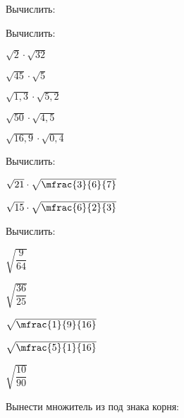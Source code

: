 \begin{class}[number=3]
\begin{listofex}
\begin{enumcols}[itemcolumns=3]
			
		\end{enumcols}
		\item Вычислить:
		\begin{enumcols}[itemcolumns=3]
			\item {}
			\item {}
			\item {}
		\end{enumcols}
		\item Вычислить:
		\begin{enumcols}[itemcolumns=5]
			\item \( \sqrt{2}\cdot\sqrt{32} \)
			\item \( \sqrt{45}\cdot\sqrt{5} \)
			\item \( \sqrt{1,3}\cdot\sqrt{5,2} \)
			\item \( \sqrt{50}\cdot\sqrt{4,5} \)
			\item \( \sqrt{16,9}\cdot\sqrt{0,4} \)
		\end{enumcols}
		\item Вычислить:
		\begin{enumcols}[itemcolumns=4]
			\item \( \sqrt{21}\cdot\sqrt{\mfrac{3}{6}{7}} \)
			\item \( \sqrt{15}\cdot\sqrt{\mfrac{6}{2}{3}} \)
			\item {}
			\item {}
		\end{enumcols}
		\item Вычислить:
		\begin{enumcols}[itemcolumns=4]
			\item \( \sqrt{\dfrac{9}{64}} \)
			\item \( \sqrt{\dfrac{36}{25}} \)
			\item \( \sqrt{\mfrac{1}{9}{16}} \)
			\item \( \sqrt{\mfrac{5}{1}{16}} \)
			\item \( \sqrt{\dfrac{10}{90}} \)
			\item {}
			\item {}
			\item {}
		\end{enumcols}
		\newpage
		\item Вынести множитель из под знака корня:

\end{listofex}
\end{class}
